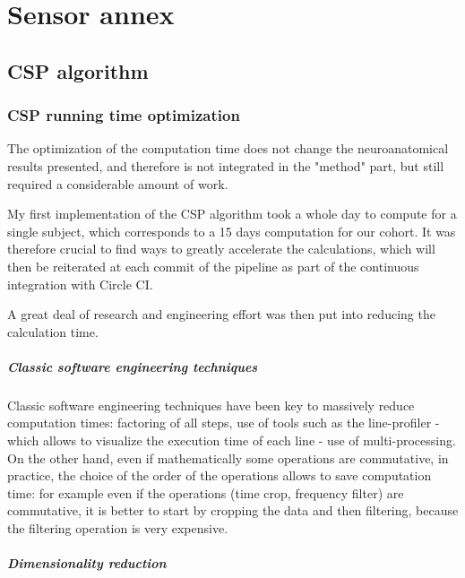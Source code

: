
\chapter{Sensor annex}


\section{CSP algorithm}

\subsection{CSP running time optimization}
\label{Sec:running_time_optimisation}

The optimization of the computation time does not change the neuroanatomical results presented, and therefore is not integrated in the "method" part, but still required a considerable amount of work.

My first implementation of the CSP algorithm took a whole day to compute for a single subject, which corresponds to a 15 days computation for our cohort. It was therefore crucial to find ways to greatly accelerate the calculations, which will then be reiterated at each commit of the pipeline as part of the continuous integration with Circle CI.

A great deal of research and engineering effort was then put into reducing the calculation time.

\paragraph{Classic software engineering techniques}

Classic software engineering techniques have been key to massively reduce computation times: factoring of all steps, use of tools such as the line-profiler - which allows to visualize the execution time of each line -  use of multi-processing. On the other hand, even if mathematically some operations are commutative, in practice, the choice of the order of the operations allows to save computation time: for example even if the operations (time crop, frequency filter) are commutative, it is better to start by cropping the data and then filtering, because the filtering operation is very expensive.

\paragraph{Dimensionality reduction}


